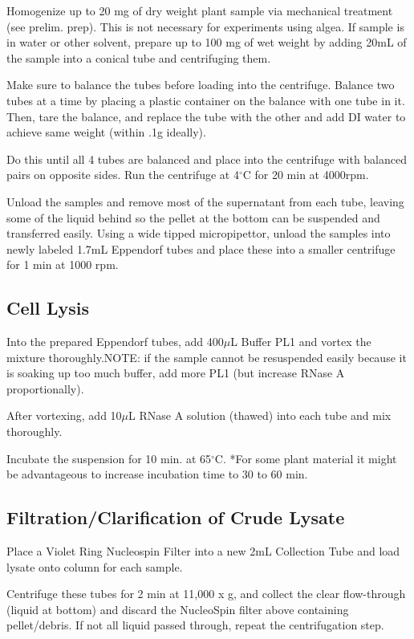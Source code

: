 \documentclass[12pt]{../SOP3_alpha}\usepackage[]{graphicx}\usepackage[]{color}
\begin{document}
\NP Homogenize up to 20 mg of dry weight plant sample via mechanical treatment (see prelim. prep). This is not necessary for experiments using algea. If sample is in water or other solvent, prepare up to 100 mg of wet weight by adding 20mL of the sample into a conical tube and centrifuging them. 

\NP Make sure to balance the tubes before loading into the centrifuge. Balance two tubes at a time by placing a plastic container on the balance with one tube in it. Then, tare the balance, and replace the tube with the other and add DI water to achieve same weight (within .1g ideally).

\NP Do this until all 4 tubes are balanced and place into the centrifuge with balanced pairs on opposite sides. Run the centrifuge at 4$^\circ$C for 20 min at 4000rpm.

\NP Unload the samples and remove most of the supernatant from each tube, leaving some of the liquid behind so the pellet at the bottom can be suspended and transferred easily. Using a wide tipped micropipettor, unload the samples into newly labeled 1.7mL Eppendorf tubes and place these into a smaller centrifuge for 1 min at 1000 rpm.


\subsection*{Cell Lysis}

\NP Into the prepared Eppendorf tubes, add 400$\mu$L Buffer PL1 and vortex the mixture thoroughly.NOTE: if the sample cannot be resuspended easily because it is soaking up too much buffer, add more PL1 (but increase RNase A proportionally).

\NP After vortexing, add 10$\mu$L RNase A solution (thawed) into each tube and mix thoroughly.

\NP Incubate the suspension for 10 min. at 65$^\circ$C. *For some plant material it might be advantageous to increase incubation time to 30 to 60 min. 

\subsection*{Filtration/Clarification of Crude Lysate}

\NP Place a Violet Ring Nucleospin Filter into a new 2mL Collection Tube and load lysate onto column for each sample. 

\NP Centrifuge these tubes for 2 min at 11,000 x g, and collect the clear flow-through (liquid at bottom) and discard the NucleoSpin filter above containing pellet/debris. If not all liquid passed through, repeat the centrifugation step.
\end{document}
